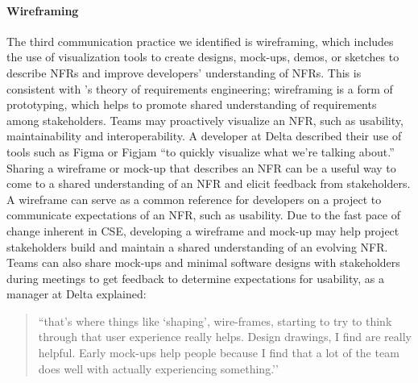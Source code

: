\documentclass[smallextended]{svjour3}
\begin{document}
\paragraph{Wireframing} The third communication practice we identified is wireframing, which includes the use of visualization tools to create designs, mock-ups, demos, or sketches to describe NFRs and improve developers' understanding of NFRs.
This is consistent with \citet{wagner2019status}'s theory of requirements engineering; wireframing is a form of prototyping, which helps to promote shared understanding of requirements among stakeholders.
Teams may proactively visualize an NFR, such as usability, maintainability and interoperability. A developer at Delta described their use of tools such as Figma or Figjam \textmd{``to quickly visualize what we're talking about.''}
Sharing a wireframe or mock-up that describes an NFR can be a useful way to come to a shared understanding of an NFR and elicit feedback from stakeholders. A wireframe can serve as a common reference for developers on a project to communicate expectations of an NFR, such as usability. Due to the fast pace of change inherent in CSE, 
developing a wireframe and mock-up may help project stakeholders build and maintain a shared understanding of an evolving NFR.
Teams can also share mock-ups and minimal software designs with stakeholders during meetings to get feedback to determine expectations for usability, as a manager at Delta explained:
\begin{quote}
    ``that’s where things like `shaping’, wire-frames, starting to try to think through that user experience really helps. Design drawings, I find are really helpful. Early mock-ups help people because I find that a lot of the team does well with actually experiencing something.''    
\end{quote}    
\end{document}

